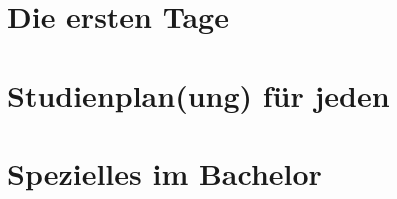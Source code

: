 \documentclass[]{papertex}
\begin{document}
	\thispagestyle{empty}
	\clearpage
	\setcounter{page}{1}
	\tableofcontents
	
	\newpage
	\section{Die ersten Tage}
		
	\newpage
	\section{Studienplan(ung) für jeden}
		\label{studienplan}
		\begin{multicols}{2}
		\end{multicols}
	\newpage
	\section{Spezielles im Bachelor}
		\label{bachelor}
\end{document}
